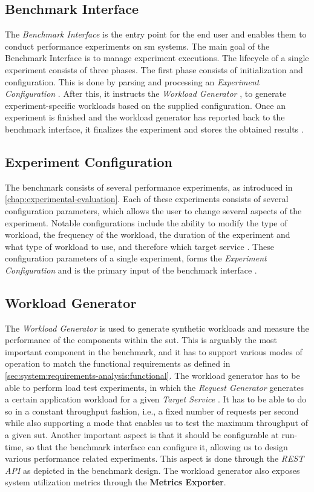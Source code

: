 \subsection{Benchmark Interface}
The \textit{Benchmark Interface}  is the entry point for the end user and enables them to conduct performance experiments on \gls{sm} systems. The main goal of the Benchmark Interface is to manage experiment executions. The lifecycle of a single experiment consists of three phases. The first phase consists of initialization and configuration. This is done by parsing and processing an \textit{Experiment Configuration} . After this, it instructs the \textit{Workload Generator} , to generate experiment-specific workloads based on the supplied configuration. Once an experiment is finished and the workload generator has reported back to the benchmark interface, it finalizes the experiment and stores the obtained results .

\subsection{Experiment Configuration}
The benchmark consists of several performance experiments, as introduced in \cref{chap:experimental-evaluation}. Each of these experiments consists of several configuration parameters, which allows the user to change several aspects of the experiment. Notable configurations include the ability to modify the type of workload, the frequency of the workload, the duration of the experiment and what type of workload to use, and therefore which target service . These configuration parameters of a single experiment, forms the \textit{Experiment Configuration}  and is the primary input of the benchmark interface .


\subsection{Workload Generator}
The \textit{Workload Generator}  is used to generate synthetic workloads and measure the performance of the components within the \gls{sut}. This is arguably the most important component in the benchmark, and it has to support various modes of operation to match the functional requirements as defined in \cref{sec:system:requirements-analysis:functional}. The workload generator has to be able to perform load test experiments, in which the \textit{Request Generator} generates a certain application workload for a given \textit{Target Service} . It has to be able to do so in a constant throughput fashion, i.e., a fixed number of requests per second while also supporting a mode that enables us to test the maximum throughput of a given \gls{sut}. Another important aspect is that it should be configurable at run-time, so that the benchmark interface  can configure it, allowing us to design various performance related experiments. This aspect is done through the \textit{REST API} as depicted in the benchmark design. The workload generator also exposes system utilization metrics through the \textbf{Metrics Exporter}.

